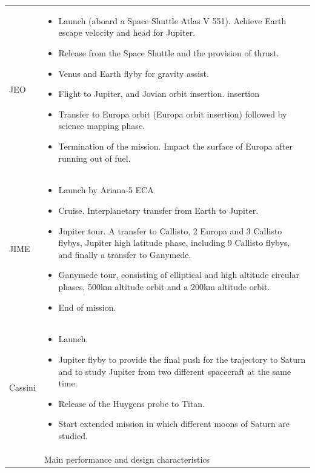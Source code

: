 \begin{supertabular}{p{.1\textwidth}p{.9\textwidth}}
  JEO & \begin{itemize}
  \item Launch (aboard a Space Shuttle Atlas V 551). Achieve Earth
    escape velocity and head for Jupiter.
  \item Release from the Space Shuttle and the provision of thrust.
  \item Venus and Earth flyby for gravity assist.
  \item Flight to Jupiter, and Jovian orbit insertion.  insertion
  \item Transfer to Europa orbit (Europa orbit insertion) followed by
    science mapping phase.
  \item Termination of the mission. Impact the surface of Europa after
    running out of fuel.
  \end{itemize} \\

  JIME & \begin{itemize}
  \item Launch by Ariana-5 ECA
  \item Cruise. Interplanetary transfer from Earth to Jupiter.
  \item Jupiter tour. A transfer to Callisto, 2 Europa
    and 3 Callisto flybys, Jupiter high latitude phase, including 9
    Callisto flybys, and finally a transfer to Ganymede.
  \item Ganymede tour, consisting of elliptical and high altitude
    circular phases, 500km altitude orbit and a 200km altitude orbit.
  \item End of mission.
  \end{itemize} \\

  Cassini & \begin{itemize}
  \item Launch.
  \item Jupiter flyby to provide the final push for the trajectory to
    Saturn and to study Jupiter from two different spacecraft at the
    same time.
  \item Release of the Huygens probe to Titan.
  \item Start extended mission in which different moons of Saturn are
    studied.
  \end{itemize} \\

  & Main performance and design characteristics \\
  \hline


\end{supertabular}
